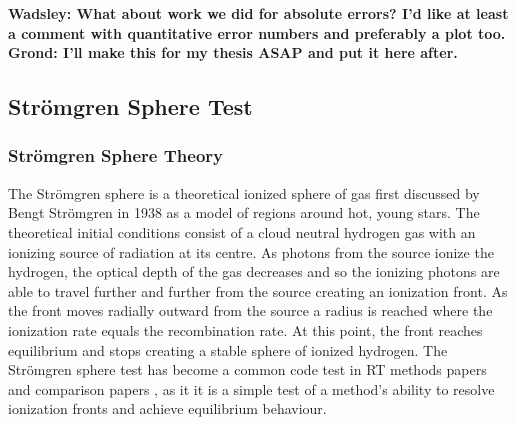 \documentclass[fleq,usenatbib]{mnras}
\newcommand{\comment}[1]{\textbf{\color{red}#1}}
\newcommand{\strom}{Str\"omgren}
\begin{document}
\comment{Wadsley: What about work we did for absolute errors? I'd like at 
least a comment with quantitative error numbers and preferably a plot too. 
Grond: I'll make this for my thesis ASAP and put it here after.}

\subsection{\strom{} Sphere Test}
\subsubsection{\strom{} Sphere Theory}
The \strom{} sphere is a theoretical ionized sphere of gas first discussed by 
Bengt \strom{} in 1938 \citep{stromgren39} as a model of regions around hot, 
young stars. The theoretical initial conditions consist of a cloud neutral 
hydrogen gas with an ionizing source of radiation at its centre. As photons 
from the source ionize the hydrogen, the optical depth of the gas decreases 
and so the ionizing photons are able to travel further and further from the 
source creating an ionization front. As the front moves radially outward from 
the source a radius is reached where the ionization rate equals the 
recombination rate. At this point, the front reaches equilibrium and stops 
creating a stable sphere of ionized hydrogen. The \strom{} sphere test has 
become a common code test in RT methods papers \citep{pawlikSchaye08,
pawlikSchaye11, petkovaSpringel11} and comparison papers \citep{ilievEt06, 
ilievEt09}, as it it is a simple test of a method's ability to resolve 
ionization fronts and achieve equilibrium behaviour.
\end{document}
